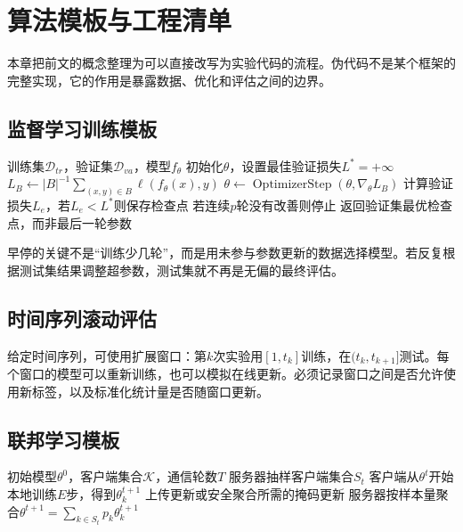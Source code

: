 \chapter{算法模板与工程清单}

本章把前文的概念整理为可以直接改写为实验代码的流程。伪代码不是某个框架的完整实现，它的作用是暴露数据、优化和评估之间的边界。

\section{监督学习训练模板}
\begin{algorithm}[htbp]
\caption{带验证集和早停的监督学习}
\begin{algorithmic}[1]
\Require 训练集$\mathcal{D}_{tr}$，验证集$\mathcal{D}_{va}$，模型$f_\theta$
\State 初始化$\theta$，设置最佳验证损失$L^*=+\infty$
  \State $L_B\gets |B|^{-1}\sum_{(x,y)\in B}\ell(f_\theta(x),y)$
  \State $\theta\gets\operatorname{OptimizerStep}(\theta,\nabla_\theta L_B)$
 \EndFor
 \State 计算验证损失$L_e$，若$L_e<L^*$则保存检查点
 \State 若连续$p$轮没有改善则停止
\EndFor
\Ensure 返回验证集最优检查点，而非最后一轮参数
\end{algorithmic}
\end{algorithm}

早停的关键不是“训练少几轮”，而是用未参与参数更新的数据选择模型。若反复根据测试集结果调整超参数，测试集就不再是无偏的最终评估。

\section{时间序列滚动评估}
给定时间序列，可使用扩展窗口：第$k$次实验用$[1,t_k]$训练，在$(t_k,t_{k+1}]$测试。每个窗口的模型可以重新训练，也可以模拟在线更新。必须记录窗口之间是否允许使用新标签，以及标准化统计量是否随窗口更新。

\section{联邦学习模板}
\begin{algorithm}[htbp]
\caption{联邦平均的抽象流程}
\begin{algorithmic}[1]
\Require 初始模型$\theta^0$，客户端集合$\mathcal{K}$，通信轮数$T$
 \State 服务器抽样客户端集合$S_t$
  \State 客户端从$\theta^t$开始本地训练$E$步，得到$\theta_k^{t+1}$
  \State 上传更新或安全聚合所需的掩码更新
 \EndFor
 \State 服务器按样本量聚合$\theta^{t+1}=\sum_{k\in S_t}p_k\theta_k^{t+1}$
\EndFor
\end{algorithmic}
\end{algorithm}


